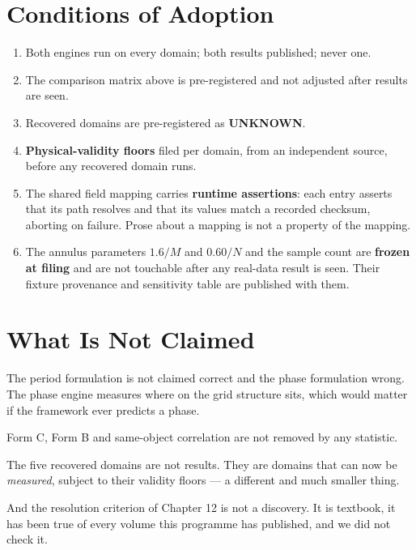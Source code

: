 \documentclass[11pt, letterpaper, openany]{book}
\begin{document}
\section{Conditions of Adoption}

\begin{enumerate}
    \item Both engines run on every domain; both results published; never one.
    \item The comparison matrix above is pre-registered and not adjusted after results are seen.
    \item Recovered domains are pre-registered as \textbf{UNKNOWN}.
    \item \textbf{Physical-validity floors} filed per domain, from an independent source, before
          any recovered domain runs.
    \item The shared field mapping carries \textbf{runtime assertions}: each entry asserts that
          its path resolves and that its values match a recorded checksum, aborting on failure.
          Prose about a mapping is not a property of the mapping.
    \item The annulus parameters $1.6/M$ and $0.60/N$ and the sample count are \textbf{frozen at
          filing} and are not touchable after any real-data result is seen. Their fixture
          provenance and sensitivity table are published with them.
\end{enumerate}

\section{What Is Not Claimed}

The period formulation is not claimed correct and the phase formulation wrong. The phase engine
measures where on the grid structure sits, which would matter if the framework ever predicts a
phase.

Form C, Form B and same-object correlation are not removed by any statistic.

The five recovered domains are not results. They are domains that can now be \emph{measured},
subject to their validity floors --- a different and much smaller thing.

And the resolution criterion of Chapter 12 is not a discovery. It is textbook, it has been true
of every volume this programme has published, and we did not check it.

\end{document}
